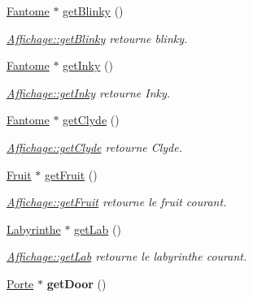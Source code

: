 \begin{DoxyCompactItemize}
\hyperlink{class_fantome}{Fantome} $\ast$ \hyperlink{class_affichage_a8adbccea72073ecbb54ac8cc81ea2a08}{get\+Blinky} ()
\begin{DoxyCompactList}\small\item\em \hyperlink{class_affichage_a8adbccea72073ecbb54ac8cc81ea2a08}{Affichage\+::get\+Blinky} retourne blinky. \end{DoxyCompactList}\item 
\hyperlink{class_fantome}{Fantome} $\ast$ \hyperlink{class_affichage_ac8f95933169c8509351d5e6efb157be8}{get\+Inky} ()
\begin{DoxyCompactList}\small\item\em \hyperlink{class_affichage_ac8f95933169c8509351d5e6efb157be8}{Affichage\+::get\+Inky} retourne Inky. \end{DoxyCompactList}\item 
\hyperlink{class_fantome}{Fantome} $\ast$ \hyperlink{class_affichage_a8983ae9f4c2ee4c623c2d1ece9965b28}{get\+Clyde} ()
\begin{DoxyCompactList}\small\item\em \hyperlink{class_affichage_a8983ae9f4c2ee4c623c2d1ece9965b28}{Affichage\+::get\+Clyde} retourne Clyde. \end{DoxyCompactList}\item 
\hyperlink{class_fruit}{Fruit} $\ast$ \hyperlink{class_affichage_a244bb1ad62d802120acdcac44433e1af}{get\+Fruit} ()
\begin{DoxyCompactList}\small\item\em \hyperlink{class_affichage_a244bb1ad62d802120acdcac44433e1af}{Affichage\+::get\+Fruit} retourne le fruit courant. \end{DoxyCompactList}\item 
\hyperlink{class_labyrinthe}{Labyrinthe} $\ast$ \hyperlink{class_affichage_ac3c48a74e47b569e260c5c68cb6223be}{get\+Lab} ()
\begin{DoxyCompactList}\small\item\em \hyperlink{class_affichage_ac3c48a74e47b569e260c5c68cb6223be}{Affichage\+::get\+Lab} retourne le labyrinthe courant. \end{DoxyCompactList}\item 
\hypertarget{class_affichage_a5c5fb58802568beea099394bb4d1d367}{}\hyperlink{class_porte}{Porte} $\ast$ {\bfseries get\+Door} ()\label{class_affichage_a5c5fb58802568beea099394bb4d1d367}


\end{DoxyCompactItemize}

